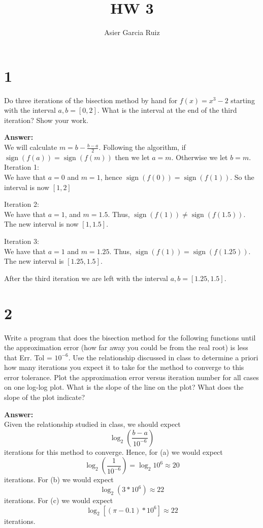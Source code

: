 \documentclass{article}
\title{HW 3}
\author{Asier Garcia Ruiz }
\DeclareMathOperator{\sign}{sign}
\begin{document}
\maketitle

\section*{1}
Do three iterations of the bisection method by hand for $f(x) = x^3 - 2$
starting with the interval $a,b = [0,2]$. What is the interval at the end
of the third iteration? Show your work.

\textbf{Answer:}\\
We will calculate $m = b - \frac{b - a}{2}$. Following the algorithm, if
$\sign(f(a)) = \sign(f(m))$ then we let $a = m$. Otherwise we let $b = m$.\\

Iteration 1:\\
We have that $a=0$ and $m = 1$, hence $\sign(f(0)) =\sign(f(1))$. So the interval
is now $[1,2]$

Iteration 2:\\
We have that $a = 1$, and $m = 1.5$. Thus, $\sign(f(1)) \neq \sign(f(1.5))$. The
new interval is now $[1,1.5]$.

Iteration 3:\\
We have that $a=1$ and $m= 1.25$. Thus, $\sign(f(1)) = \sign(f(1.25))$. The new
interval is $[1.25,1.5]$.

After the third iteration we are left with the interval $a,b = [1.25,1.5]$.

\section*{2}
Write a program that does the bisection method for the following functions
until the approximation error (how far away you could be from the real root)
is less that Err. Tol = $10^{-6}$. Use the relationship discussed in class to
determine a priori how many iterations you expect it to take for the method to
converge to this error tolerance. Plot the approximation error versus
iteration number for all cases on one log-log plot. What is the slope of the
line on the plot? What does the slope of the plot indicate?

\textbf{Answer:}\\
Given the relationship studied in class, we should expect
\[\log_2\left(\frac{b-a}{10^{-6}}\right)\]
iterations for this method to converge. Hence, for (a) we would expect
\[\log_2\left(\frac{1}{10^{-6}}\right) = \log_2 10^6 \approx 20\]
iterations. For (b) we would expect
\[\log_2 (3 * 10^6) \approx 22\]
iterations. For (c) we would expect
\[\log_2 [(\pi - 0.1)*10^6] \approx 22 \]
iterations.
\end{document}

